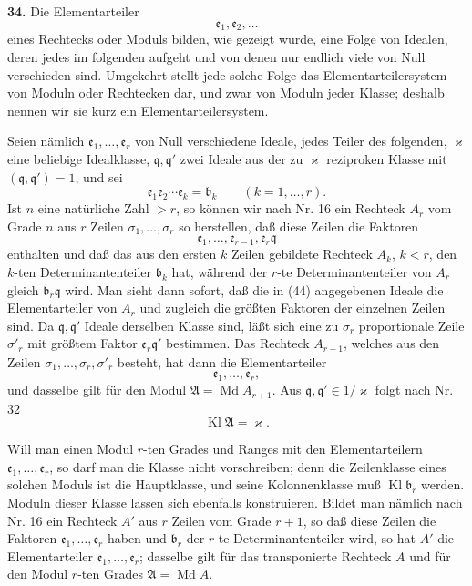 \documentclass[11pt,a4paper]{article}
\newcommand{\Kl}{\operatorname{Kl}}
\begin{document}
\textbf{34.} Die Elementarteiler
\[
 \mathfrak e_1,\mathfrak e_2,\ldots
\]
eines Rechtecks oder Moduls bilden, wie gezeigt wurde, eine Folge von Idealen, deren jedes im folgenden aufgeht und von denen nur endlich viele von Null verschieden sind. Umgekehrt stellt jede solche Folge das Elementarteilersystem von Moduln oder Rechtecken dar, und zwar von Moduln jeder Klasse; deshalb nennen wir sie kurz ein Elementarteilersystem.

Seien nämlich \(\mathfrak e_1,\ldots,\mathfrak e_r\) von Null verschiedene Ideale, jedes Teiler des folgenden, \(\varkappa\) eine beliebige Idealklasse, \(\mathfrak q,\mathfrak q'\) zwei Ideale aus der zu \(\varkappa\) reziproken Klasse mit \((\mathfrak q,\mathfrak q')=1\), und sei
\[
 \mathfrak e_1\mathfrak e_2\cdots\mathfrak e_k=\mathfrak b_k\qquad(k=1,\ldots,r).
\]
Ist \(n\) eine natürliche Zahl \(>r\), so können wir nach Nr. 16 ein Rechteck \(A_r\) vom Grade \(n\) aus \(r\) Zeilen \(\sigma_1,\ldots,\sigma_r\) so herstellen, daß diese Zeilen die Faktoren
\[
 \mathfrak e_1,\ldots,\mathfrak e_{r-1},\mathfrak e_r\mathfrak q \tag{44}
\]
enthalten und daß das aus den ersten \(k\) Zeilen gebildete Rechteck \(A_k\), \(k<r\), den \(k\)-ten Determinantenteiler \(\mathfrak b_k\) hat, während der \(r\)-te Determinantenteiler von \(A_r\) gleich \(\mathfrak b_r\mathfrak q\) wird. Man sieht dann sofort, daß die in (44) angegebenen Ideale die Elementarteiler von \(A_r\) und zugleich die größten Faktoren der einzelnen Zeilen sind. Da \(\mathfrak q,\mathfrak q'\) Ideale derselben Klasse sind, läßt sich eine zu \(\sigma_r\) proportionale Zeile \(\sigma'_r\) mit größtem Faktor \(\mathfrak e_r\mathfrak q'\) bestimmen. Das Rechteck \(A_{r+1}\), welches aus den Zeilen \(\sigma_1,\ldots,\sigma_r,\sigma'_r\) besteht, hat dann die Elementarteiler
\[
 \mathfrak e_1,\ldots,\mathfrak e_r,
\]
und dasselbe gilt für den Modul \(\mathfrak A=\operatorname{Md}A_{r+1}\). Aus \(\mathfrak q,\mathfrak q'\in 1/\varkappa\) folgt nach Nr. 32
\[
 \Kl\mathfrak A=\varkappa.
\]

Will man einen Modul \(r\)-ten Grades und Ranges mit den Elementarteilern \(\mathfrak e_1,\ldots,\mathfrak e_r\), so darf man die Klasse nicht vorschreiben; denn die Zeilenklasse eines solchen Moduls ist die Hauptklasse, und seine Kolonnenklasse muß \(\Kl\mathfrak b_r\) werden. Moduln dieser Klasse lassen sich ebenfalls konstruieren. Bildet man nämlich nach Nr. 16 ein Rechteck \(A'\) aus \(r\) Zeilen vom Grade \(r+1\), so daß diese Zeilen die Faktoren \(\mathfrak e_1,\ldots,\mathfrak e_r\) haben und \(\mathfrak b_r\) der \(r\)-te Determinantenteiler wird, so hat \(A'\) die Elementarteiler \(\mathfrak e_1,\ldots,\mathfrak e_r\); dasselbe gilt für das transponierte Rechteck \(A\) und für den Modul \(r\)-ten Grades \(\mathfrak A=\operatorname{Md}A\).
\end{document}
